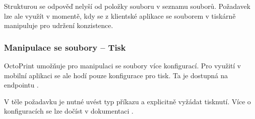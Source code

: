 Strukturou se odpověď nelyší od položky souboru v seznamu souborů.
Požadavek lze ale využít v momentě, kdy se z klientské aplikace se souborem v tiskárně manipuluje pro udržení konzistence.

\subsubsection*{Manipulace se soubory -- Tisk}

OctoPrint umožňuje pro manipulaci se soubory více konfigurací.
Pro využití v mobilní aplikaci se ale hodí pouze konfigurace pro tisk.
Ta je dostupná na endpointu .

V těle požadavku je nutné uvést typ příkazu a explicitně vyžádat tisknutí.
Více o konfiguracích se lze dočíst v dokumentaci \cite{octoprint-api-filecommand}.

